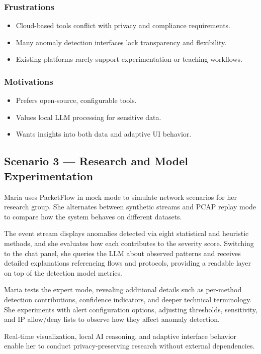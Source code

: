 \documentclass[
    11pt, 
    a4paper, 
    parskip=half, 
    headsepline,       %
    DIV=12             %
]{scrartcl}
\begin{document}
\subsubsection*{Frustrations}
\begin{itemize}
    \item Cloud-based tools conflict with privacy and compliance requirements.
    \item Many anomaly detection interfaces lack transparency and flexibility.
    \item Existing platforms rarely support experimentation or teaching workflows.
\end{itemize}

\subsubsection*{Motivations}
\begin{itemize}
    \item Prefers open-source, configurable tools.
    \item Values local LLM processing for sensitive data.
    \item Wants insights into both data and adaptive UI behavior.
\end{itemize}

\subsection*{Scenario 3 --- Research and Model Experimentation}
Maria uses PacketFlow in mock mode to simulate network scenarios for her research group. She alternates between synthetic streams and PCAP replay mode to compare how the system behaves on different datasets.

The event stream displays anomalies detected via eight statistical and heuristic methods, and she evaluates how each contributes to the severity score. Switching to the chat panel, she queries the LLM about observed patterns and receives detailed explanations referencing flows and protocols, providing a readable layer on top of the detection model metrics.

Maria tests the expert mode, revealing additional details such as per-method detection contributions, confidence indicators, and deeper technical terminology. She experiments with alert configuration options, adjusting thresholds, sensitivity, and IP allow/deny lists to observe how they affect anomaly detection.

Real-time visualization, local AI reasoning, and adaptive interface behavior enable her to conduct privacy-preserving research without external dependencies.
\end{document}
